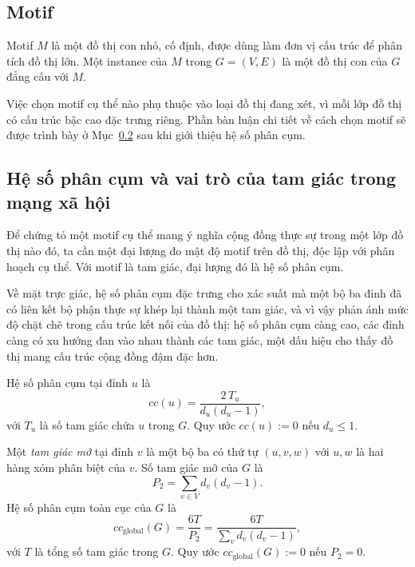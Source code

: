 \subsection{Motif}
\label{subsec:motif}

\begin{definition}
\label{def:motif}
Motif $M$ là một đồ thị con nhỏ, cố định, được dùng làm đơn vị cấu trúc để phân tích đồ thị lớn. Một instance của $M$ trong $G = (V, E)$ là một đồ thị con của $G$ đẳng cấu với $M$.
\end{definition}

Việc chọn motif cụ thể nào phụ thuộc vào loại đồ thị đang xét, vì mỗi lớp đồ thị có cấu trúc bậc cao đặc trưng riêng. Phần bàn luận chi tiết về cách chọn motif sẽ được trình bày ở Mục~\ref{subsec:cc} sau khi giới thiệu hệ số phân cụm.

\subsection{Hệ số phân cụm và vai trò của tam giác trong mạng xã hội}
\label{subsec:cc}

Để chứng tỏ một motif cụ thể mang ý nghĩa cộng đồng thực sự trong một lớp đồ thị nào đó, ta cần một đại lượng đo mật độ motif trên đồ thị, độc lập với phân hoạch cụ thể. Với motif là tam giác, đại lượng đó là hệ số phân cụm. 

Về mặt trực giác, hệ số phân cụm đặc trưng cho xác suất mà một bộ ba đỉnh đã có liên kết bộ phận thực sự khép lại thành một tam giác, và vì vậy phản ánh mức độ chặt chẽ trong cấu trúc kết nối của đồ thị: hệ số phân cụm càng cao, các đỉnh càng có xu hướng đan vào nhau thành các tam giác, một dấu hiệu cho thấy đồ thị mang cấu trúc cộng đồng đậm đặc hơn.

\begin{definition}
\label{def:local-cc}
Hệ số phân cụm tại đỉnh $u$ là
\[
    cc(u) = \frac{2 \, T_u}{d_u (d_u - 1)},
\]
với $T_u$ là số tam giác chứa $u$ trong $G$. Quy ước $cc(u) := 0$ nếu $d_u \leq 1$.
\end{definition}

\begin{definition}
\label{def:global-cc}
Một \emph{tam giác mở} tại đỉnh $v$ là một bộ ba có thứ tự $(u, v, w)$ với $u, w$ là hai hàng xóm phân biệt của $v$. Số tam giác mở của $G$ là
\[
    P_2 = \sum_{v \in V} d_v (d_v - 1).
\]
Hệ số phân cụm toàn cục của $G$ là
\[
    cc_{\mathrm{global}}(G) = \frac{6 T}{P_2} = \frac{6 T}{\sum_{v} d_v (d_v - 1)},
\]
với $T$ là tổng số tam giác trong $G$. Quy ước $cc_{\mathrm{global}}(G) := 0$ nếu $P_2 = 0$.
\end{definition}

